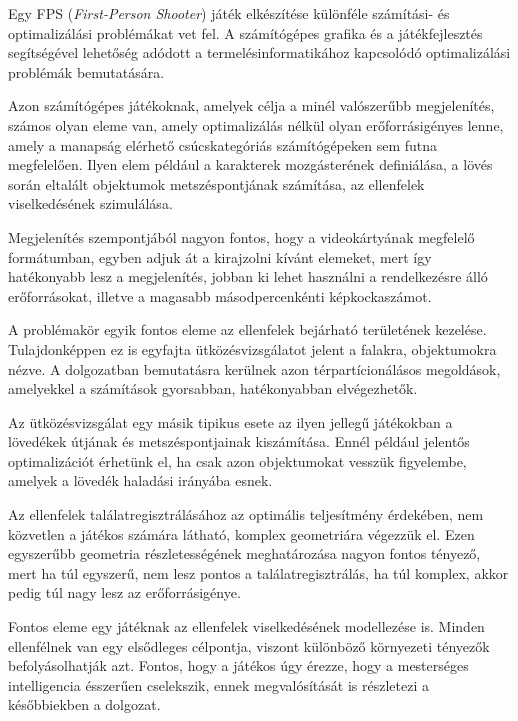 \label{Chap:bevezetes}

Egy FPS (\textit{First-Person Shooter}) játék elkészítése különféle számítási- és optimalizálási problémákat vet fel. A számítógépes grafika és a játékfejlesztés segítségével lehetőség adódott a termelésinformatikához kapcsolódó optimalizálási problémák bemutatására.

Azon számítógépes játékoknak, amelyek célja a minél valószerűbb megjelenítés, számos olyan eleme van, amely optimalizálás nélkül olyan erőforrásigényes lenne, amely a manapság elérhető csúcskategóriás számítógépeken sem futna megfelelően. Ilyen elem például a karakterek mozgásterének definiálása, a lövés során eltalált objektumok metszéspontjának számítása, az ellenfelek viselkedésének szimulálása.

Megjelenítés szempontjából nagyon fontos, hogy a videokártyának megfelelő formátumban, egyben adjuk át a kirajzolni kívánt elemeket, mert így hatékonyabb lesz a megjelenítés, jobban ki lehet használni a rendelkezésre álló erőforrásokat, illetve a magasabb másodpercenkénti képkockaszámot.

A problémakör egyik fontos eleme az ellenfelek bejárható területének kezelése. Tulajdonképpen ez is egyfajta ütközésvizsgálatot jelent a falakra, objektumokra nézve. A dolgozatban bemutatásra kerülnek azon térpartícionálásos megoldások, amelyekkel a számítások gyorsabban, hatékonyabban elvégezhetők.

Az ütközésvizsgálat egy másik tipikus esete az ilyen jellegű játékokban a lövedékek útjának és metszéspontjainak kiszámítása. Ennél például jelentős optimalizációt érhetünk el, ha csak azon objektumokat vesszük figyelembe, amelyek a lövedék haladási irányába esnek.


Az ellenfelek találatregisztrálásához az optimális teljesítmény érdekében, nem közvetlen a játékos számára látható, komplex geometriára végezzük el. Ezen egyszerűbb geometria részletességének meghatározása nagyon fontos tényező, mert ha túl egyszerű, nem lesz pontos a találatregisztrálás, ha túl komplex, akkor pedig túl nagy lesz az erőforrásigénye.

Fontos eleme egy játéknak az ellenfelek viselkedésének modellezése is. Minden ellenfélnek van egy elsődleges célpontja, viszont különböző környezeti tényezők befolyásolhatják azt. Fontos, hogy a játékos úgy érezze, hogy a mesterséges intelligencia ésszerűen cselekszik, ennek megvalósítását is részletezi a későbbiekben a dolgozat.
